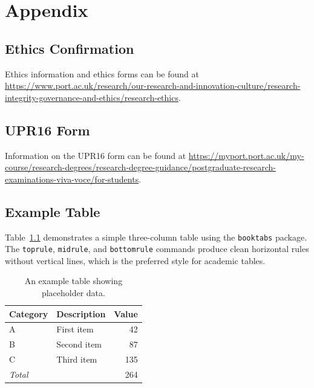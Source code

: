 \chapter{Appendix}
\label{chap:Appendix}
\captionsetup[figure]{list=no}
\captionsetup[table]{list=no}



\section*{Ethics Confirmation}
Ethics information and ethics forms can be found at \url{https://www.port.ac.uk/research/our-research-and-innovation-culture/research-integrity-governance-and-ethics/research-ethics}.


\section*{UPR16 Form}
Information on the UPR16 form can be found at \url{https://myport.port.ac.uk/my-course/research-degrees/research-degree-guidance/postgraduate-research-examinations-viva-voce/for-students}.


\section*{Example Table}

Table~\ref{tab:example_appendix} demonstrates a simple three-column table using the \texttt{booktabs} package. The \texttt{toprule}, \texttt{midrule}, and \texttt{bottomrule} commands produce clean horizontal rules without vertical lines, which is the preferred style for academic tables.

\begin{table}[ht]
    \centering
    \caption{An example table showing placeholder data.}
    \label{tab:example_appendix}
    \begin{tabular}{llr}
        \toprule
        \textbf{Category} & \textbf{Description} & \textbf{Value} \\
        \midrule
        A & First item  & 42  \\
        B & Second item & 87  \\
        C & Third item  & 135 \\
        \midrule
        \multicolumn{2}{l}{\textit{Total}} & 264 \\
        \bottomrule
    \end{tabular}
\end{table}


